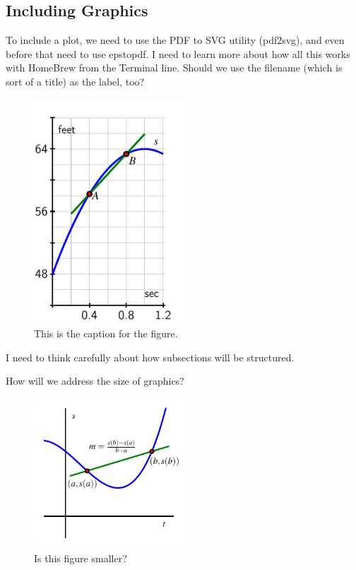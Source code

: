 \documentclass[10pt,]{book}
\theoremstyle{plain}
\theoremstyle{definition}
\theoremstyle{definition}
\theoremstyle{definition}
\begin{document}
\subsection[Including Graphics]{Including Graphics}\label{subsection-1}
To include a plot, we need to use the PDF to SVG utility (pdf2svg), and even before that need to use epstopdf.  I need to learn more about how all this works with HomeBrew from the Terminal line.  Should we use the filename (which is sort of a title) as the label, too? %
\leavevmode%
\begin{figure}
\centering
\includegraphics[width=0.50\textwidth,]{images/act-sec-soln.pdf}\caption{This is the caption for the figure. \label{test_figure_1}}
\end{figure}
\par
I need to think carefully about how subsections will be structured.%
\par
How will we address the size of graphics?%
\leavevmode%
\begin{figure}
\centering
\includegraphics[width=0.50\textwidth,]{images/der-vel-summary.pdf}\caption{Is this figure smaller? \label{test_figure_2}}
\end{figure}
\typeout{************************************************}
\typeout{************************************************}
\end{document}
